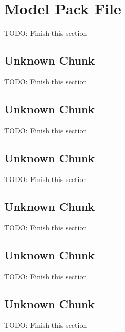 \section{Model Pack File}
\label{sec:pfMODL}

TODO: Finish this section

\subsection{Unknown Chunk}
\label{subsec:pfchunkANIM}

TODO: Finish this section

\subsection{Unknown Chunk}
\label{subsec:pfchunkMODL}

TODO: Finish this section

\subsection{Unknown Chunk}
\label{subsec:pfchunkGEOM}

TODO: Finish this section

\subsection{Unknown Chunk}
\label{subsec:pfchunkPRPS}

TODO: Finish this section

\subsection{Unknown Chunk}
\label{subsec:pfchunkROOT}

TODO: Finish this section

\subsection{Unknown Chunk}
\label{subsec:pfchunkSKEL}

TODO: Finish this section



